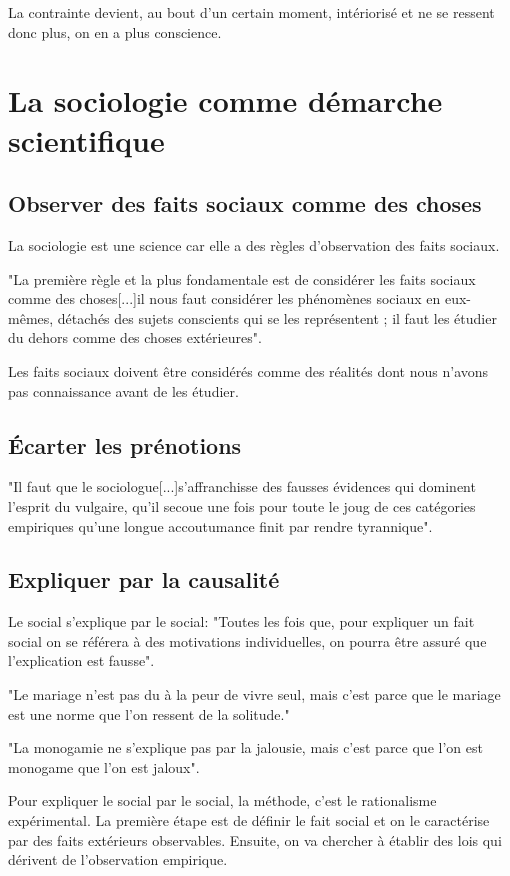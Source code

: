\documentclass[10pt, a4paper, openany]{book}
\begin{document}
La contrainte devient, au bout d'un certain moment, intériorisé et ne se ressent donc plus, on en a plus conscience. 

\section{La sociologie comme démarche scientifique}

\subsection{Observer des faits sociaux comme des choses}

La sociologie est une science car elle a des règles d'observation des faits sociaux.

"La première règle et la plus fondamentale est de considérer les faits sociaux comme des choses[...]il nous faut considérer les phénomènes sociaux en eux-mêmes, détachés des sujets conscients qui se les représentent ; il faut les étudier du dehors comme des choses extérieures".

Les faits sociaux doivent être considérés comme des réalités dont nous n'avons pas connaissance avant de les étudier.

\subsection{Écarter les prénotions}
"Il faut que le sociologue[...]s'affranchisse des fausses évidences qui dominent l'esprit du vulgaire, qu'il secoue une fois pour toute le joug de ces catégories empiriques qu'une longue accoutumance finit par rendre tyrannique".

\subsection{Expliquer par la causalité}

Le social s'explique par le social: "Toutes les fois que, pour expliquer un fait social on se référera à des motivations individuelles, on pourra être assuré que l'explication est fausse".

"Le mariage n'est pas du à la peur de vivre seul, mais c'est parce que le mariage est une norme que l'on ressent de la solitude."

"La monogamie ne s'explique pas par la jalousie, mais c'est parce que l'on est monogame que l'on est jaloux". 

Pour expliquer le social par le social, la méthode, c'est le rationalisme expérimental. La première étape est de définir le fait social et on le caractérise par des faits extérieurs observables. Ensuite, on va chercher à établir des lois qui dérivent de l'observation empirique.
\end{document}

